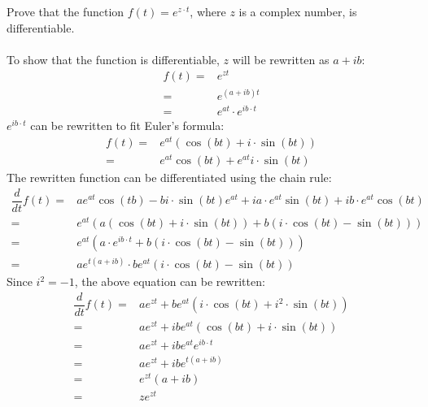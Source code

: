 \begin{prof}{}{}
Prove that the function $f(t)=e^{z\cdot t}$, where $z$ is a complex number, is differentiable.
\\ \\
To show that the function is differentiable, $z$ will be rewritten as $a+ ib$:
\begin{align*}
	f(t) =& e^{zt} \\
		 =& e^{(a+ib)t} \\
		 =& e^{at} \cdot e^{ib\cdot t}
\end{align*}
$e^{ib\cdot t}$ can be rewritten to fit Euler's formula:
\begin{align*}
	f(t) =& e^{at}\left(\cos(bt)+i \cdot \sin(bt)\right) \\
		 =& e^{at}\cos(bt) + e^{at} i \cdot \sin(bt)
\end{align*}
The rewritten function can be differentiated using the chain rule:
\begin{align*}
	\dfrac{d}{dt}f(t) =& ae^{at}\cos(tb) -bi \cdot \sin(bt)e^{at} + ia \cdot e^{at}\sin(bt) + ib \cdot e^{at}\cos(bt) \\
	=& e^{at} \left( a(\cos(bt) + i \cdot \sin(bt)) + b(i \cdot \cos(bt) - \sin(bt)) \right) \\
	=& e^{at}(a \cdot e^{ib \cdot t}+b(i \cdot \cos(bt) - \sin(bt))) \\
	=& a e^{t(a+ib)} \cdot b e^{at}(i \cdot \cos(bt) - \sin(bt))
\end{align*}
Since $i^2 = -1$, the above equation can be rewritten:
\begin{align*}
	\dfrac{d}{dt}f(t) =& a e^{zt} + b e^{at}(i \cdot \cos(bt) + i^2 \cdot \sin(bt)) \\
	=&  a e^{zt} + ib e^{at}(\cos(bt) + i \cdot \sin(bt)) \\
	=&  a e^{zt} + ib e^{at}e^{ib \cdot t} \\
	=&  a e^{zt} + ib e^{t(a+ib)} \\
	=&  e^{zt}(a+ib) \\
	=&  ze^{zt}
\end{align*}
\end{prof}
